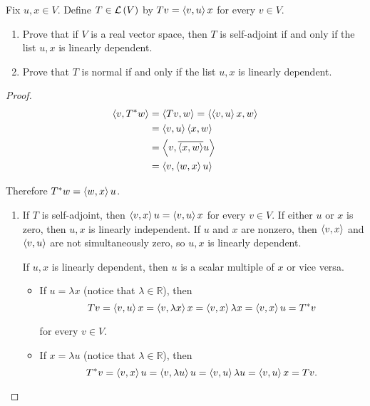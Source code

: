 \begin{exercise}
    Fix $u, x\in V$. Define $T\in \mathcal{L}\left({V}\right)$ by $Tv = \left\langle{v, u}\right\rangle x$ for every $v\in V$.
    \begin{enumerate}[label={(\alph*)}]
        \item Prove that if $V$ is a real vector space, then $T$ is self-adjoint if and only if the list $u, x$ is linearly dependent.
        \item Prove that $T$ is normal if and only if the list $u, x$ is linearly dependent.
    \end{enumerate}
\end{exercise}

\begin{proof}
    \begin{align*}
        \left\langle{v, T^{*}w}\right\rangle & = \left\langle{Tv, w}\right\rangle = \left\langle{\left\langle{v, u}\right\rangle x, w}\right\rangle \\
                              & = \left\langle{v, u}\right\rangle\left\langle{x, w}\right\rangle \\
                              & = \left\langle{v, \overline{\left\langle{x, w}\right\rangle}u}\right\rangle \\
                              & = \left\langle{v, \left\langle{w, x}\right\rangle u}\right\rangle
    \end{align*}

    Therefore $T^{*}w = \left\langle{w, x}\right\rangle u$.
    \begin{enumerate}[label={(\alph*)}]
        \item If $T$ is self-adjoint, then $\left\langle{v, x}\right\rangle u = \left\langle{v, u}\right\rangle x$ for every $v\in V$. If either $u$ or $x$ is zero, then $u, x$ is linearly independent. If $u$ and $x$ are nonzero, then $\left\langle{v, x}\right\rangle$ and $\left\langle{v, u}\right\rangle$ are not simultaneously zero, so $u, x$ is linearly dependent.

        If $u, x$ is linearly dependent, then $u$ is a scalar multiple of $x$ or vice versa.
        \begin{itemize}
            \item If $u = \lambda x$ (notice that $\lambda\in\mathbb{R}$), then
            \[
                Tv = \left\langle{v, u}\right\rangle x = \left\langle{v, \lambda x}\right\rangle x = \left\langle{v, x}\right\rangle\lambda x = \left\langle{v, x}\right\rangle u = T^{*}v
            \]

            for every $v\in V$.
            \item If $x = \lambda u$ (notice that $\lambda\in\mathbb{R}$), then
            \[
                T^{*}v = \left\langle{v, x}\right\rangle u = \left\langle{v, \lambda u}\right\rangle u = \left\langle{v, u}\right\rangle\lambda u = \left\langle{v, u}\right\rangle x = Tv.
            \]
        \end{itemize}


\end{enumerate}
\end{proof}
